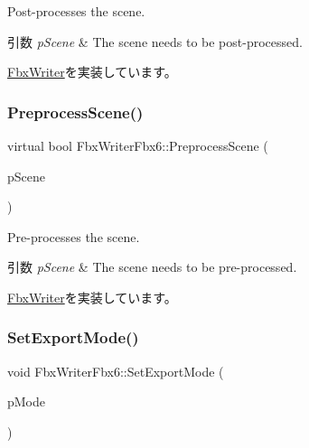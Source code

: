 Post-\/processes the scene. 
\begin{DoxyParams}{引数}
{\em p\+Scene} & The scene needs to be post-\/processed. \\
\hline
\end{DoxyParams}


\hyperlink{class_fbx_writer_a1cfdf59f72ebe777484862e4b64b5d65}{Fbx\+Writer}を実装しています。

\mbox{\label{class_fbx_writer_fbx6_a5109088d4869c129427058045efb8808}} 
\subsubsection{\texorpdfstring{Preprocess\+Scene()}{PreprocessScene()}}
{\footnotesize\ttfamily virtual bool Fbx\+Writer\+Fbx6\+::\+Preprocess\+Scene (\begin{DoxyParamCaption}\item[{\hyperlink{class_fbx_scene}{Fbx\+Scene} \&}]{p\+Scene }\end{DoxyParamCaption})\hspace{0.3cm}{\ttfamily [virtual]}}

Pre-\/processes the scene. 
\begin{DoxyParams}{引数}
{\em p\+Scene} & The scene needs to be pre-\/processed. \\
\hline
\end{DoxyParams}


\hyperlink{class_fbx_writer_a0fd62ec785e7108924975591ee8fbf30}{Fbx\+Writer}を実装しています。

\mbox{\label{class_fbx_writer_fbx6_a34aaf430c9225fbfcab85168a9dd47c6}} 
\subsubsection{\texorpdfstring{Set\+Export\+Mode()}{SetExportMode()}}
{\footnotesize\ttfamily void Fbx\+Writer\+Fbx6\+::\+Set\+Export\+Mode (\begin{DoxyParamCaption}\item[{\hyperlink{class_fbx_writer_fbx6_a8fd1f1f068e0ba64fe7694877bf15f21}{E\+Export\+Mode}}]{p\+Mode }\end{DoxyParamCaption})}

